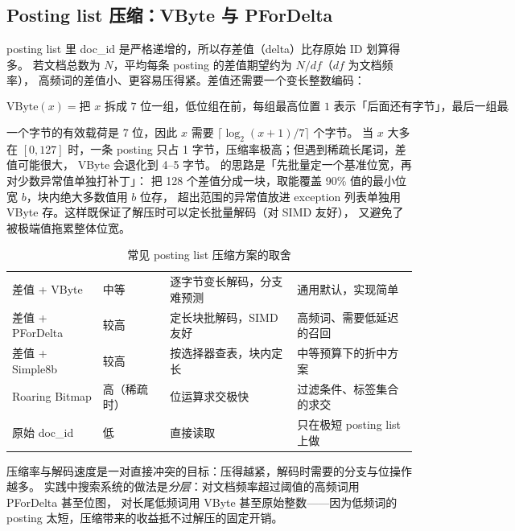 \subsection{Posting list 压缩：VByte 与 PForDelta}

posting list 里 doc\_id 是严格递增的，所以存差值（delta）比存原始 ID 划算得多。
若文档总数为 $N$，平均每条 posting 的差值期望约为 $N / df$（$df$ 为文档频率），
高频词的差值小、更容易压得紧。差值还需要一个变长整数编码：

\begin{equation}
\text{VByte}(x) = \text{把 } x \text{ 拆成 7 位一组，低位组在前，每组最高位置 1 表示「后面还有字节」，最后一组最高位置 0} .
\label{eq:vbyte}
\end{equation}

一个字节的有效载荷是 7 位，因此 $x$ 需要 $\lceil \log_2 (x+1) / 7 \rceil$ 个字节。
当 $x$ 大多在 $[0,127]$ 时，一条 posting 只占 1 字节，压缩率极高；但遇到稀疏长尾词，差值可能很大，
VByte 会退化到 4--5 字节。 的思路是「先批量定一个基准位宽，再对少数异常值单独打补丁」：
把 128 个差值分成一块，取能覆盖 90\% 值的最小位宽 $b$，块内绝大多数值用 $b$ 位存，
超出范围的异常值放进 exception 列表单独用 VByte 存。这样既保证了解压时可以定长批量解码（对 SIMD 友好），
又避免了被极端值拖累整体位宽。

\begin{table}[htbp]
\centering
\caption{常见 posting list 压缩方案的取舍}
\label{tab:compression}
\small
\begin{tabularx}{\textwidth}{L{2.4cm} L{1.9cm} L{3.2cm} Y}
\toprule
{} &  &  &  \\
\midrule
差值 + VByte & 中等 & 逐字节变长解码，分支难预测 & 通用默认，实现简单 \\
差值 + PForDelta & 较高 & 定长块批解码，SIMD 友好 & 高频词、需要低延迟的召回 \\
差值 + Simple8b & 较高 & 按选择器查表，块内定长 & 中等预算下的折中方案 \\
Roaring Bitmap & 高（稀疏时） & 位运算求交极快 & 过滤条件、标签集合的求交 \\
原始 doc\_id & 低 & 直接读取 & 只在极短 posting list 上做 \\
\bottomrule
\end{tabularx}
\end{table}

压缩率与解码速度是一对直接冲突的目标：压得越紧，解码时需要的分支与位操作越多。
实践中搜索系统的做法是\emph{分层}：对文档频率超过阈值的高频词用 PForDelta 甚至位图，
对长尾低频词用 VByte 甚至原始整数——因为低频词的 posting 太短，压缩带来的收益抵不过解压的固定开销。

